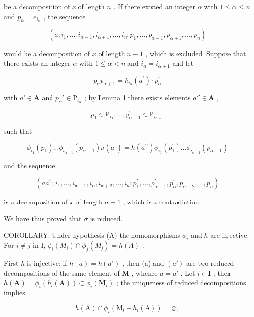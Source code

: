 be a decomposition of \(x\) of length \(n\) . If there existed an integer \(\alpha\) with \(1 \leqslant \alpha \leqslant n\) and \(p_{\alpha} = e_{i_{\alpha}}\) , the sequence

\[
(a; i _ {1}, \dots , i _ {\alpha - 1}, i _ {\alpha + 1}, \dots , i _ {n}; p _ {1}, \dots , p _ {\alpha - 1}, p _ {\alpha + 1}, \dots , p _ {n})
\]

would be a decomposition of \(x\) of length \(n - 1\) , which is excluded. Suppose that there exists an integer \(\alpha\) with \(1 \leqslant \alpha < n\) and \(i_{\alpha} = i_{\alpha + 1}\) and let

\[
p _ {\alpha} p _ {\alpha + 1} = h _ {i _ {\alpha}} \left(a ^ {\prime}\right) \cdot p _ {\alpha} ^ {\prime}
\]

with \(a' \in \mathbf{A}\) and \(p_{\alpha}' \in \mathrm{P}_{t_{\alpha}}\) ; by Lemma 1 there exists elements \(a'' \in \mathbf{A}\) ,

\[
p _ {1} ^ {\prime} \in \mathrm{P} _ {i _ {1}}, \dots , p _ {\alpha - 1} ^ {\prime} \in \mathrm{P} _ {i _ {\alpha - 1}}
\]

such that

\[
\phi_ {i _ {1}} (p _ {1}) \dots \phi_ {i _ {\alpha - 1}} (p _ {\alpha - 1}) h (a ^ {\prime}) = h (a ^ {\prime \prime}) \phi_ {i _ {1}} (p _ {1} ^ {\prime}) \dots \phi_ {i _ {\alpha - 1}} (p _ {\alpha - 1} ^ {\prime})
\]

and the sequence

\[
\left(a a ^ {\prime \prime}; i _ {1}, \dots , i _ {\alpha - 1}, i _ {\alpha}, i _ {\alpha + 2}, \dots , i _ {n}; p _ {1} ^ {\prime}, \dots , p _ {\alpha - 1} ^ {\prime}, p _ {\alpha} ^ {\prime}, p _ {\alpha + 2}, \dots , p _ {n}\right)
\]

is a decomposition of \(x\) of length \(n - 1\) , which is a contradiction.

We have thus proved that \(\sigma\) is reduced.

COROLLARY. Under hypothesis (A) the homomorphisms \(\phi_i\) and \(h\) are injective. For \(i \neq j\) in I, \(\phi_i(M_i) \cap \phi_j(M_j) = h(A)\) .

First \(h\) is injective: if \(h(a) = h(a')\) , then (a) and \((a')\) are two reduced decompositions of the same element of \(\mathbf{M}\) , whence \(a = a'\) . Let \(i \in \mathbf{I}\) ; then \(h(\mathbf{A}) = \phi_i(h_i(\mathbf{A})) \subset \phi_i(\mathbf{M}_i)\) ; the uniqueness of reduced decompositions implies

\[
h (\mathrm{A}) \cap \phi_ {i} (\mathrm{M} _ {i} - h _ {i} (\mathrm{A})) = \varnothing ,
\]

